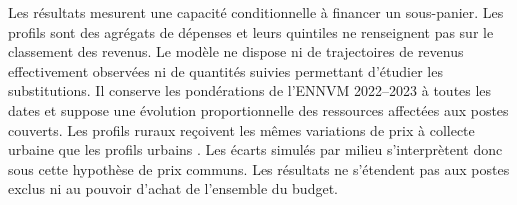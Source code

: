 Les résultats mesurent une capacité conditionnelle à financer un sous-panier. Les profils sont des agrégats de dépenses et leurs quintiles ne renseignent pas sur le classement des revenus. Le modèle ne dispose ni de trajectoires de revenus effectivement observées ni de quantités suivies permettant d'étudier les substitutions. Il conserve les pondérations de l'ENNVM 2022--2023 à toutes les dates et suppose une évolution proportionnelle des ressources affectées aux postes couverts. Les profils ruraux reçoivent les mêmes variations de prix à collecte urbaine que les profils urbains \cite{hcpIPC}. Les écarts simulés par milieu s'interprètent donc sous cette hypothèse de prix communs. Les résultats ne s'étendent pas aux postes exclus ni au pouvoir d'achat de l'ensemble du budget.
